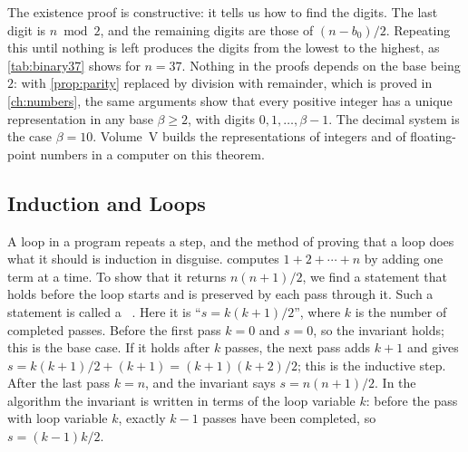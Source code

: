 The existence proof is constructive: it tells us how to find the digits. The last digit is $n\bmod2$, and the remaining digits are those of $(n-b_0)/2$. Repeating this until nothing is left produces the digits from the lowest to the highest, as \cref{tab:binary37} shows for $n=37$. Nothing in the proofs depends on the base being $2$: with \cref{prop:parity} replaced by division with remainder, which is proved in \cref{ch:numbers}, the same arguments show that every positive integer has a unique representation in any base $\beta\ge2$, with digits $0,1,\ldots,\beta-1$. The decimal system is the case $\beta=10$. Volume~V builds the representations of integers and of floating-point numbers in a computer on this theorem.

\begin{table}
\end{table}

\subsection{Induction and Loops}

A loop in a program repeats a step, and the method of proving that a loop does what it should is induction in disguise.  computes $1+2+\cdots+n$ by adding one term at a time. To show that it returns $n(n+1)/2$, we find a statement that holds before the loop starts and is preserved by each pass through it. Such a statement is called a ~\cite{floyd1967,hoare1969,cormen2022}. Here it is ``$s=k(k+1)/2$'', where $k$ is the number of completed passes. Before the first pass $k=0$ and $s=0$, so the invariant holds; this is the base case. If it holds after $k$ passes, the next pass adds $k+1$ and gives $s=k(k+1)/2+(k+1)=(k+1)(k+2)/2$; this is the inductive step. After the last pass $k=n$, and the invariant says $s=n(n+1)/2$. In the algorithm the invariant is written in terms of the loop variable $k$: before the pass with loop variable $k$, exactly $k-1$ passes have been completed, so $s=(k-1)k/2$.

